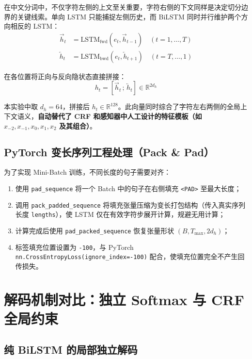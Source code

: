 \documentclass[11pt,a4paper]{ctexart}
\begin{document}
在中文分词中，不仅字符左侧的上文至关重要，字符右侧的下文同样是决定切分边界的关键线索。单向 LSTM 只能捕捉左侧历史，而 BiLSTM 同时并行维护两个方向相反的 LSTM：
\begin{align}
    \overrightarrow{h}_t &= \text{LSTM}_{\text{fwd}}(e_t, \overrightarrow{h}_{t-1}) \quad (t = 1, \dots, T) \\
    \overleftarrow{h}_t &= \text{LSTM}_{\text{bwd}}(e_t, \overleftarrow{h}_{t+1}) \quad (t = T, \dots, 1)
\end{align}

在各位置将正向与反向隐状态直接拼接：
\begin{equation}
    h_t = \left[ \overrightarrow{h}_t \,;\, \overleftarrow{h}_t \right] \in \mathbb{R}^{2 d_h}
\end{equation}

本实验中取 $d_h = 64$，拼接后 $h_t \in \mathbb{R}^{128}$。此向量同时综合了字符左右两侧的全局上下文语义，\textbf{自动替代了 CRF 和感知器中人工设计的特征模板（如 $x_{-2}, x_{-1}, x_0, x_1, x_2$ 及其组合）}。

\subsection{PyTorch 变长序列工程处理（Pack \& Pad）}

为了实现 Mini-Batch 训练，不同长度的句子需要对齐：
\begin{enumerate}
    \item 使用 \texttt{pad\_sequence} 将一个 Batch 中的句子在右侧填充 \texttt{<PAD>} 至最大长度；
    \item 调用 \texttt{pack\_padded\_sequence} 将填充张量压缩为变长打包结构（传入真实序列长度 \texttt{lengths}），使 LSTM 仅在有效字符步展开计算，规避无用计算；
    \item 计算完成后使用 \texttt{pad\_packed\_sequence} 恢复张量形状 $(B, T_{\max}, 2d_h)$；
    \item 标签填充位置设置为 \texttt{-100}，与 PyTorch \texttt{nn.CrossEntropyLoss(ignore\_index=-100)} 配合，使填充位置完全不产生回传损失。
\end{enumerate}

\section{解码机制对比：独立 Softmax 与 CRF 全局约束}

\subsection{纯 BiLSTM 的局部独立解码}
\end{document}
